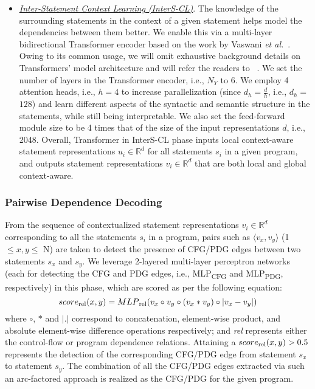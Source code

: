 \begin{itemize}[leftmargin=*, listparindent=\parindent, parsep=0pt, itemsep=\topsep]
    \item \underline{\textit{Inter-Statement Context Learning (InterS-CL)}}. The knowledge of the surrounding statements in the context of a given statement helps \tool model the dependencies between them better. We enable this via a multi-layer bidirectional Transformer encoder based on the work by Vaswani {\em et al.}~\cite{Vaswani-2017}. Owing to its common usage, we will omit exhaustive background details on Transformers' model architecture and will refer the readers to ~\cite{Vaswani-2017}. We set the number of layers in the Transformer encoder, i.e., $N_Y$ to 6. We employ 4 attention heads, i.e., $h$$=$$4$ to increase parallelization (since $d_h$$=$$\frac{d}{h}$, i.e., $d_h$$=$$128$) and learn different aspects of the syntactic and semantic structure in the statements, while still being interpretable. We also set the feed-forward module size to be 4 times that of the size of the input representations $d$, i.e., 2048. Overall, Transformer in InterS-CL phase inputs local context-aware statement representations $u_i \in \mathbb{R}^d$ for all statements $s_i$ in a given program, and outputs statement representations $v_i \in \mathbb{R}^d$ that are both local and global context-aware.
\end{itemize}

\subsubsection{Pairwise Dependence Decoding}
From the sequence of contextualized statement representations $v_i \in\mathbb{R}^d$ corresponding to all the statements $s_i$ in a program, pairs such as $\langle v_x, v_y \rangle$ (1$\leq x, y\leq$ N) are taken to detect the presence of CFG/PDG edges between two statements $s_x$ and $s_y$. We leverage 2-layered multi-layer perceptron networks (each for detecting the CFG and PDG edges, i.e., MLP\textsubscript{CFG} and MLP\textsubscript{PDG}, respectively) in this phase, which are scored as per the following equation:
\begin{equation}
\centering
    score\textsubscript{rel}(x, y) = MLP\textsubscript{rel}(v_x \circ v_y \circ (v_x * v_y) \circ |v_x - v_y|) \nonumber
\end{equation}
where $\circ$, $*$ and $|.|$ correspond to concatenation, element-wise
product, and absolute element-wise difference operations respectively;
and \textit{rel} represents either the control-flow or program
dependence relations. 
Attaining a $score\textsubscript{rel}(x, y) >
0.5$ represents the detection of the corresponding CFG/PDG edge from
statement $s_x$ to statement $s_y$. The combination of all the CFG/PDG
edges extracted via such an arc-factored approach is realized as the
CFG/PDG for the given program.

